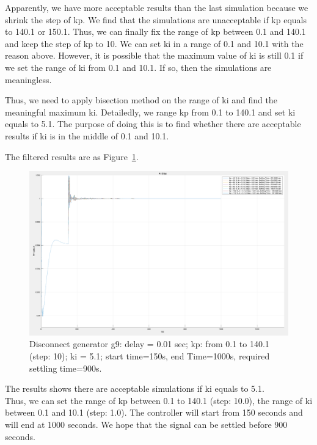 Apparently, we have more acceptable results than the last simulation because we shrink the step of kp. We find that the simulations are unacceptable if kp equals to 140.1 or 150.1. Thus, we can finally fix the range of kp between 0.1 and 140.1 and keep the step of kp to 10. We can set ki in a range of 0.1 and 10.1 with the reason above. However, it is possible that the maximum value of ki is still 0.1 if we set the range of ki from 0.1 and 10.1. If so, then the simulations are meaningless.  

Thus, we need to apply bisection method on the range of ki and find the meaningful maximum ki. Detailedly, we range kp from 0.1 to 140.1 and set ki equals to 5.1. The purpose of doing this is to find whether there are acceptable results if ki is in the middle of 0.1 and 10.1.

The filtered results are as Figure~\ref{4_1_2_c}.  

\begin{figure}[htbp]
\centering
\includegraphics[width = .819\textwidth]{figure/4_1_2_c.png}
\caption{Disconnect generator g9: delay = 0.01 sec; kp: from 0.1 to 140.1 (step: 10); ki = 5.1; start time=150s, end Time=1000s, required settling time=900s.}
\label{4_1_2_c}
\end{figure}

The results shows there are acceptable simulations if ki equals to 5.1. \\

Thus, we can set the range of kp between 0.1 to 140.1 (step: 10.0), the range of ki between 0.1 and 10.1 (step: 1.0). The controller will start from 150 seconds and will end at 1000 seconds. We hope that the signal can be settled before 900 seconds.